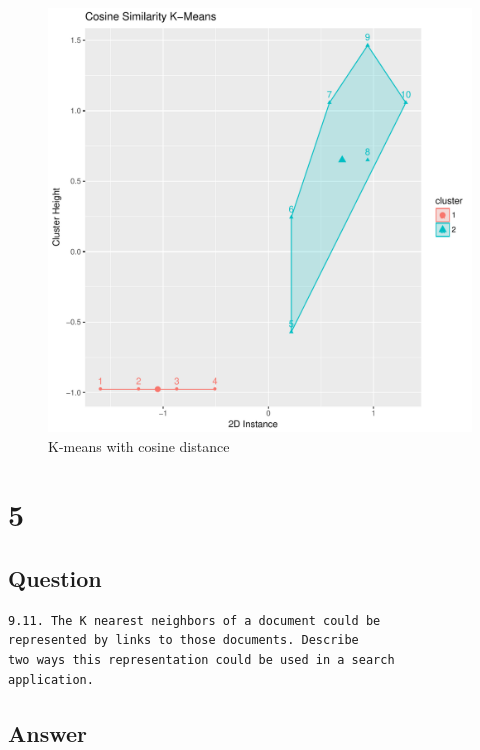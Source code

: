 \documentclass[letterpaper,11pt]{article}
\begin{document}
\begin{figure}[h]
\centering
\includegraphics[scale=0.5]{kmeans-cos.pdf}
\caption{K-means with cosine distance}
\label{fig:kmeans-cos}
\end{figure}

\clearpage


\section*{5}

\subsection*{Question}

\begin{verbatim}
9.11. The K nearest neighbors of a document could be 
represented by links to those documents. Describe 
two ways this representation could be used in a search
application.
\end{verbatim}

\subsection*{Answer}
\end{document}
